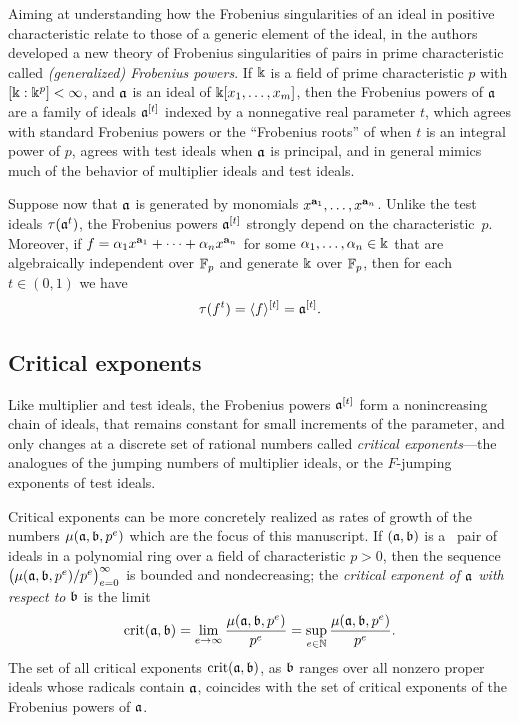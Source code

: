 \documentclass{article}
\begin{document}
Aiming at understanding how the Frobenius singularities of an ideal in positive characteristic relate to those of a generic element of the ideal, in \cite{hernandez+etal.frobenius_powers} the authors developed a new theory of Frobenius singularities of pairs in prime characteristic called \emph{\textup{(}generalized\textup{)} Frobenius powers}. 
If $\Bbbk$ is a field of prime characteristic $p$ with $[\Bbbk:\Bbbk^p] <\infty$, and $\mathfrak{a}$ is an ideal of $\Bbbk[x_1, \ldots, x_m]$, then the Frobenius powers of $\mathfrak{a}$ are a family of ideals $\mathfrak{a}^{[t]}$ indexed by a nonnegative real parameter $t$, which agrees with standard Frobenius powers or the ``Frobenius roots'' of \cite{blickle+mustata+smith.discr_rat_FPTs} when $t$ is an integral power of $p$, agrees with test ideals when $\mathfrak{a}$ is principal, and in general mimics much of the behavior of multiplier ideals and test ideals.

Suppose now that $\mathfrak{a}$ is generated by monomials $x^{\mathbf{a}_1},\ldots,x^{\mathbf{a}_n}$.
Unlike the test ideals $\tau(\mathfrak{a}^t)$, the Frobenius powers $\mathfrak{a}^{[t]}$ strongly depend on the characteristic~$p$.
Moreover, if $f=\alpha_1x^{\mathbf{a}_1}+\cdots+\alpha_nx^{\mathbf{a}_n}$ for some $\alpha_1,\ldots,\alpha_n \in \Bbbk$ that are algebraically independent over $\mathbb{F}_p$ and generate $\Bbbk$ over $\mathbb{F}_p$, then for each $t \in (0,1)$ we have
\[\tau(f^t) = \langle f \rangle^{[t]} = \mathfrak{a}^{[t]}.\]

\subsection{Critical exponents}

Like multiplier and test ideals, the Frobenius powers $\mathfrak{a}^{[t]}$ form a nonincreasing chain of ideals, that remains constant for small increments of the parameter, and only changes at a discrete set of rational numbers called \emph{critical exponents}---the analogues of the jumping numbers of multiplier ideals, or the $F$-jumping exponents of test ideals.

Critical exponents can be more concretely realized as rates of growth of the numbers $\mu(\mathfrak{a},\mathfrak{b},p^e)$ which are the focus of this manuscript.
If $(\mathfrak{a},\mathfrak{b})$ is a \compatible\ pair of ideals in a polynomial ring over a field of characteristic $p>0$, then the sequence $\big(\mu(\mathfrak{a},\mathfrak{b},p^e)/p^e\big)_{e=0}^\infty$ is bounded and nondecreasing; the \emph{critical exponent of $\mathfrak{a}$ with respect to $\mathfrak{b}$} is the limit
\[
   \operatorname{crit}(\mathfrak{a},\mathfrak{b}) = \lim_{e\to \infty} \frac{\mu(\mathfrak{a},\mathfrak{b},p^e)}{p^e}
   = \sup_{e\in \mathbb{N}} \frac{\mu(\mathfrak{a},\mathfrak{b},p^e)}{p^e}.
\]
The set of all critical exponents $\operatorname{crit}(\mathfrak{a},\mathfrak{b})$, as $\mathfrak{b}$ ranges over all nonzero proper ideals whose radicals contain $\mathfrak{a}$, coincides with the set of critical exponents of the Frobenius powers of $\mathfrak{a}$.
\end{document}
